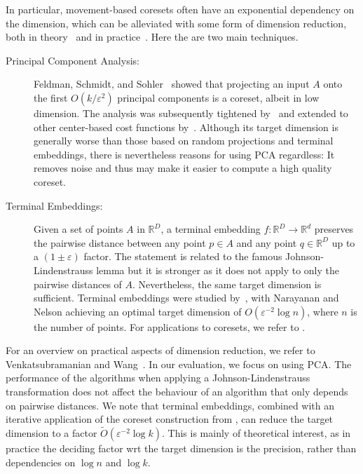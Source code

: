 In particular, movement-based coresets often have an exponential dependency on the dimension, which can be alleviated with some form of dimension reduction, both in theory~\cite{SSS19} and in practice~\cite{KappmeierS015}.
Here the are two main techniques.

\begin{description}
\item[Principal Component Analysis:] Feldman, Schmidt, and Sohler~\cite{FSS13} showed that projecting an input $A$ onto the first $O(k/\varepsilon^2)$ principal components is a coreset, albeit in low dimension. The analysis was subsequently tightened by~\cite{CEMMP15} and extended to other center-based cost functions by~\cite{SohlerW18}. Although its target dimension is generally worse than those based on random projections and terminal embeddings, there is nevertheless reasons for using PCA regardless: It removes noise and thus may make it easier to compute a high quality coreset.
\item[Terminal Embeddings:] Given a set of points $A$ in $\mathbb{R}^D$, a terminal embedding $f:\mathbb{R}^D\rightarrow \mathbb{R}^d$ preserves the pairwise distance between any point $p\in A$ and any point $q\in \mathbb{R}^D$ up to a $(1\pm \varepsilon)$ factor. The statement is related to the famous Johnson-Lindenstrauss lemma but it is stronger as it does not apply to only the pairwise distances of $A$. Nevertheless, the same target dimension is sufficient. Terminal embeddings were studied by~\cite{ElkinFN17,MahabadiMMR18,NaN18}, with Narayanan and Nelson \cite{NaN18} achieving an optimal target dimension of $O(\varepsilon^{-2}\log n)$, where $n$ is the number of points. For applications to coresets, we refer to \cite{BecchettiBC0S19,Cohen-AddadSS21,huang2020coresets}.
\end{description}

For an overview on practical aspects of dimension reduction, we refer to Venkatsubramanian and Wang~\cite{VenkatasubramanianW11}. In our evaluation, we  focus on using PCA. The performance of the algorithms when applying a Johnson-Lindenstrauss transformation does not affect the behaviour of an algorithm that only depends on pairwise distances. We note that terminal embeddings, combined with an iterative application of the coreset construction from \cite{BravermanJKW21}, can reduce the target dimension to a factor $\tilde{O}(\varepsilon^{-2} \log k)$. This is mainly of theoretical interest, as in practice the deciding factor wrt the target dimension is the precision, rather than dependencies on $\log n$ and $\log k$.